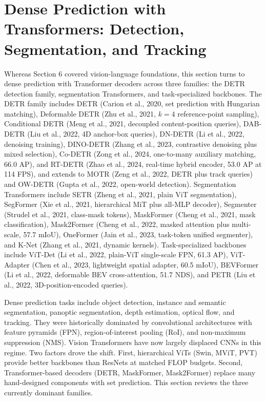 \documentclass{article}
\begin{document}
\section{Dense Prediction with Transformers: Detection, Segmentation, and Tracking}\label{dense-prediction-with-transformers-detection-segmentation-and-tracking}

Whereas Section 6 covered vision-language foundations, this section turns to dense prediction with Transformer decoders across three families: the DETR detection family, segmentation Transformers, and task-specialized backbones. The DETR family includes DETR (Carion et al., 2020, set prediction with Hungarian matching), Deformable DETR (Zhu et al., 2021, \(k{=}4\) reference-point sampling), Conditional DETR (Meng et al., 2021, decoupled content-position queries), DAB-DETR (Liu et al., 2022, 4D anchor-box queries), DN-DETR (Li et al., 2022, denoising training), DINO-DETR (Zhang et al., 2023, contrastive denoising plus mixed selection), Co-DETR (Zong et al., 2024, one-to-many auxiliary matching, 66.0 AP), and RT-DETR (Zhao et al., 2024, real-time hybrid encoder, 53.0 AP at 114 FPS), and extends to MOTR (Zeng et al., 2022, DETR plus track queries) and OW-DETR (Gupta et al., 2022, open-world detection). Segmentation Transformers include SETR (Zheng et al., 2021, plain ViT segmentation), SegFormer (Xie et al., 2021, hierarchical MiT plus all-MLP decoder), Segmenter (Strudel et al., 2021, class-mask tokens), MaskFormer (Cheng et al., 2021, mask classification), Mask2Former (Cheng et al., 2022, masked attention plus multi-scale, 57.7 mIoU), OneFormer (Jain et al., 2023, task-token unified segmenter), and K-Net (Zhang et al., 2021, dynamic kernels). Task-specialized backbones include ViT-Det (Li et al., 2022, plain-ViT single-scale FPN, 61.3 AP), ViT-Adapter (Chen et al., 2023, lightweight spatial adapter, 60.5 mIoU), BEVFormer (Li et al., 2022, deformable BEV cross-attention, 51.7 NDS), and PETR (Liu et al., 2022, 3D-position-encoded queries).

Dense prediction tasks include object detection, instance and semantic segmentation, panoptic segmentation, depth estimation, optical flow, and tracking. They were historically dominated by convolutional architectures with feature pyramids (FPN), region-of-interest pooling (RoI), and non-maximum suppression (NMS). Vision Transformers have now largely displaced CNNs in this regime. Two factors drove the shift. First, hierarchical ViTs (Swin, MViT, PVT) provide better backbones than ResNets at matched FLOP budgets. Second, Transformer-based decoders (DETR, MaskFormer, Mask2Former) replace many hand-designed components with set prediction. This section reviews the three currently dominant families.
\end{document}
